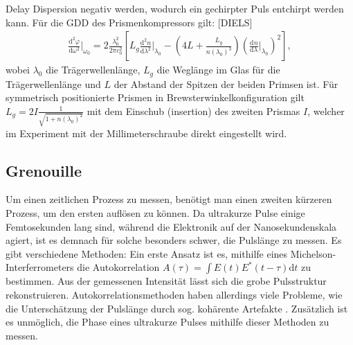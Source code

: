 \documentclass[twoside,        %
               BCOR12mm,       %
               english,ngerman, %
               fleqn,headsepline=false,footsepline=false
              ]{Vorlage/MFPREPORT}
\renewcommand{\d}{\ensuremath{\mathrm{d}}} %
\newcommand{\diff}[3][]{\ensuremath{\frac{\d^{#1}#2}{\d#3^{#1}}}} %
\begin{document}
Delay Dispersion negativ werden, wodurch ein gechirpter Puls entchirpt werden kann. Für die GDD des Prismenkompressors gilt: [DIELS]
\begin{align}
    \diff[2]{\varphi}{\omega}|_{\omega_0}=2\frac{\lambda_0^2}{2\pi c_0^2}\left[
    L_g\diff[2]{n}{\lambda}|_{\lambda_0}-(4L+\frac{L_g}{n(\lambda_0)^3})(\diff{n}{\lambda}|_{\lambda_0})^2
    \right],
    \label{eq:pc}
\end{align}
wobei $\lambda_0$ die Trägerwellenlänge, $L_g$ die Weglänge im Glas für die
Trägerwellenlänge und $L$ der Abstand der Spitzen der beiden Primsen ist. Für
symmetrisch positionierte Prismen in Brewsterwinkelkonfiguration gilt
$L_g=2I\frac{1}{\sqrt{1+n(\lambda_0)^2}}$ mit dem Einschub (insertion) des
zweiten Prismas $I$, welcher im Experiment mit der Millimeterschraube direkt
eingestellt wird.

\subsection{Grenouille}
Um einen zeitlichen Prozess zu messen, benötigt man einen zweiten kürzeren Prozess, um
den ersten auflösen zu können. Da ultrakurze Pulse einige Femtosekunden lang
sind, während die Elektronik auf der Nanosekundenskala agiert, ist es demnach
für solche besonders schwer, die Pulslänge zu messen. 
Es gibt verschiedene Methoden: Ein erste Ansatz ist es, mithilfe eines
Michelson-Interferrometers die Autokorrelation $A(\tau)=\int E(t)E^*(t-\tau)\d
t$ zu bestimmen. Aus der gemessenen Intensität lässt sich die grobe
Pulsstruktur rekonstruieren. Autokorrelationsmethoden haben allerdings viele
Probleme, wie die Unterschätzung der Pulslänge durch sog. kohärente Artefakte
\cite{swampintro}. Zusätzlich ist es unmöglich, die Phase eines ultrakurze
Pulses mithilfe dieser Methoden zu messen.
\end{document}
